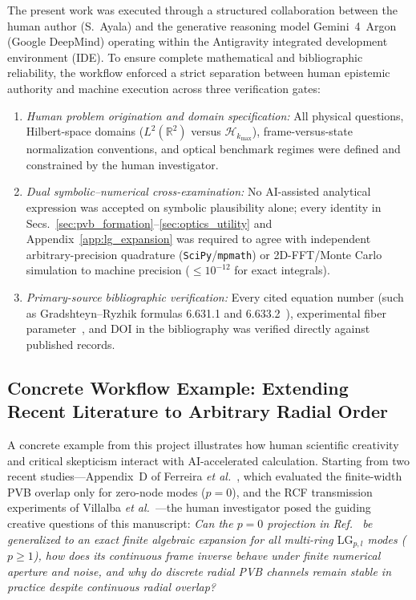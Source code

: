\documentclass[aps,pra,reprint,amsmath,amssymb,floatfix,longbibliography]{revtex4-2}
\begin{document}
The present work was executed through a structured collaboration between the human author (S.~Ayala) and the generative reasoning model Gemini~4~Argon (Google DeepMind) operating within the Antigravity integrated development environment (IDE). To ensure complete mathematical and bibliographic reliability, the workflow enforced a strict separation between human epistemic authority and machine execution across three verification gates:
\begin{enumerate}
\item \emph{Human problem origination and domain specification:} All physical questions, Hilbert-space domains ($L^2(\mathbb{R}^2)$ versus $\mathcal{H}_{k_{\max}}$), frame-versus-state normalization conventions, and optical benchmark regimes were defined and constrained by the human investigator.
\item \emph{Dual symbolic--numerical cross-examination:} No AI-assisted analytical expression was accepted on symbolic plausibility alone; every identity in Secs.~\ref{sec:pvb_formation}--\ref{sec:optics_utility} and Appendix~\ref{app:lg_expansion} was required to agree with independent arbitrary-precision quadrature (\texttt{SciPy}/\texttt{mpmath}) or 2D-FFT/Monte Carlo simulation to machine precision ($\le 10^{-12}$ for exact integrals).
\item \emph{Primary-source bibliographic verification:} Every cited equation number (such as Gradshteyn--Ryzhik formulas 6.631.1 and 6.633.2~\cite{Gradshteyn2014}), experimental fiber parameter~\cite{Villalba2023}, and DOI in the bibliography was verified directly against published records.
\end{enumerate}

\subsection{Concrete Workflow Example: Extending Recent Literature to Arbitrary Radial Order}
\label{subsec:ai_case_study}

A concrete example from this project illustrates how human scientific creativity and critical skepticism interact with AI-accelerated calculation. Starting from two recent studies—Appendix~D of Ferreira \emph{et al.}~\cite{Ferreira2026}, which evaluated the finite-width PVB overlap only for zero-node modes ($p = 0$), and the RCF transmission experiments of Villalba \emph{et al.}~\cite{Villalba2023}—the human investigator posed the guiding creative questions of this manuscript: \emph{Can the $p = 0$ projection in Ref.~\cite{Ferreira2026} be generalized to an exact finite algebraic expansion for all multi-ring $\mathrm{LG}_{p,l}$ modes ($p \ge 1$), how does its continuous frame inverse behave under finite numerical aperture and noise, and why do discrete radial PVB channels remain stable in practice despite continuous radial overlap?}
\end{document}
